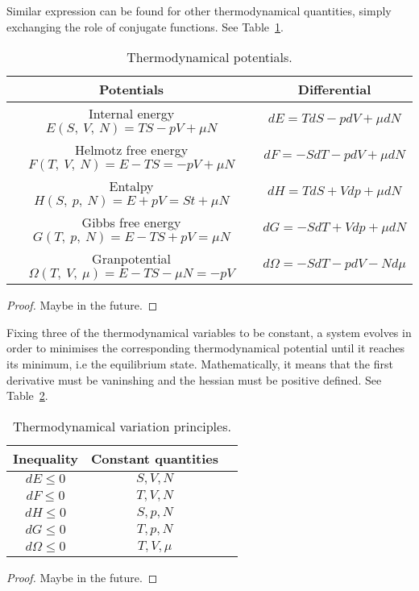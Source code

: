     Similar expression can be found for other thermodynamical quantities, simply exchanging the role of conjugate functions. See Table~\ref{table:2}.

    \begin{table}[h!]
        \centering
        \begin{tabular}{c | c}
        Potentials & Differential \\
        \hline
        Internal energy $E(S, ~V, ~N) = TS - pV + \mu N$ & $dE = TdS - pdV + \mu dN$ \\ 
        Helmotz free energy $F(T, ~V, ~N) = E - TS = -pV + \mu N$ & $dF = -SdT - pdV + \mu dN$ \\ 
        Entalpy $H(S, ~p, ~N) = E + pV = St + \mu N$ & $dH = TdS + Vdp + \mu dN$ \\ 
        Gibbs free energy $G(T, ~p, ~N) = E - TS + pV = \mu N$ & $dG = -SdT + V dp + \mu dN$ \\ 
        Granpotential $\Omega (T, ~V, ~\mu) = E - TS - \mu N = -pV$ & $d\Omega = -SdT - pdV - N d \mu$ \\ 
        \end{tabular}
    \caption{Thermodynamical potentials.}
    \label{table:2}
    \end{table}

    \begin{proof}
        Maybe in the future.
    \end{proof}

    Fixing three of the thermodynamical variables to be constant, a system evolves in order to minimises the corresponding thermodynamical potential until it reaches its minimum, i.e the equilibrium state. Mathematically, it means that the first derivative must be vaninshing and the hessian must be positive defined. See Table~\ref{table:3}.

    \begin{table}[h!]
        \centering
        \begin{tabular}{c | c | c}
        Inequality & Constant quantities & \\
        \hline
        $d E \leq 0$ & $S, V, N$\\ 
        $d F \leq 0$ & $T, V, N$\\ 
        $d H \leq 0$ & $S, p, N$\\ 
        $d G \leq 0$ & $T, p, N$\\ 
        $d \Omega \leq 0$ & $T, V, \mu$\\ 
        \end{tabular}
    \caption{Thermodynamical variation principles.}
    \label{table:3}
    \end{table}

    \begin{proof}
        Maybe in the future.
    \end{proof}